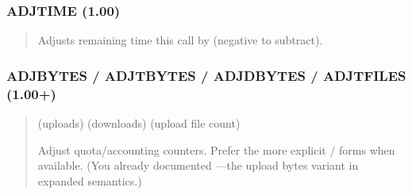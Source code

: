 \documentclass[letterpaper,10pt,english]{sphinxmanual}
\begin{document}
\subsubsection{ADJTIME (1.00)}
\label{\detokenize{ppl:adjtime-1-00}}\begin{quote}

\sphinxAtStartPar
{}
\begin{description}
\sphinxAtStartPar
Adjusts remaining time this call by  (negative to subtract).

\end{description}
\end{quote}


\subsubsection{ADJBYTES / ADJTBYTES / ADJDBYTES / ADJTFILES (1.00+)}
\label{\detokenize{ppl:adjbytes-adjtbytes-adjdbytes-adjtfiles-1-00}}\begin{quote}

\sphinxAtStartPar
{}
 (uploads)
 (downloads)
 (upload file count)
\begin{description}
\sphinxAtStartPar
Adjust quota/accounting counters. Prefer the more explicit / forms when available.
(You already documented —the upload bytes variant in expanded semantics.)

\end{description}
\end{quote}
\end{document}
